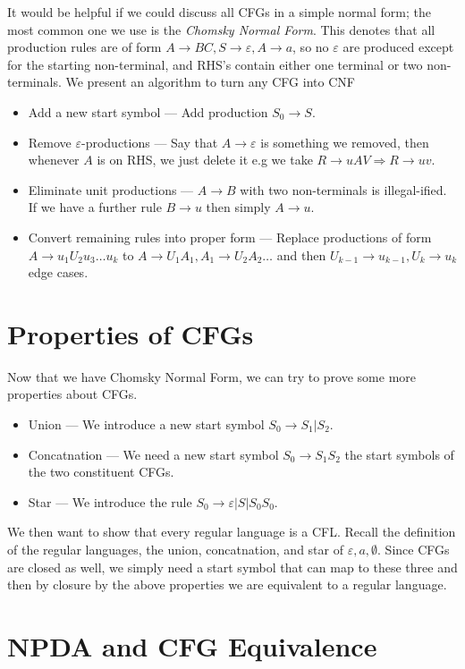 \documentclass[10pt]{report}
\begin{document}
It would be helpful if we could discuss all CFGs in a simple normal form; the most common one we use is the \emph{Chomsky Normal Form}. This denotes that all production rules are of form $A \to BC, S \to \varepsilon, A\to a$, so no $\varepsilon$ are produced except for the starting non-terminal, and RHS's contain either one terminal or two non-terminals. We present an algorithm to turn any CFG into CNF
\begin{itemize}
    \item Add a new start symbol --- Add production $S_0 \to S$.
    \item Remove $\varepsilon$-productions --- Say that $A \to \varepsilon$ is something we removed, then whenever $A$ is on RHS, we just delete it e.g we take $R \to uAV \Rightarrow R \to uv$.
    \item Eliminate unit productions --- $A \to B$ with two non-terminals is illegal-ified. If we have a further rule $B \to u$ then simply $A \to u$.
    \item Convert remaining rules into proper form --- Replace productions of form $A \to u_1 U_2 u_3\dots u_k$ to $A \to U_1A_1, A_1 \to U_2A_2 \dots$ and then $U_{k-1} \to u_{k-1}, U_{k} \to u_k$ edge cases.
\end{itemize}

\section{Properties of CFGs}

Now that we have Chomsky Normal Form, we can try to prove some more properties about CFGs.
\begin{itemize}
    \item Union --- We introduce a new start symbol $S_0 \to S_1 | S_2$.
    \item Concatnation --- We need a new start symbol $S_0 \to S_1S_2$ the start symbols of the two constituent CFGs.
    \item Star --- We introduce the rule $S_0 \to \varepsilon | S | S_0S_0$.
\end{itemize}

We then want to show that every regular language is a CFL. Recall the definition of the regular languages, the union, concatnation, and star of $\varepsilon, a, \emptyset$. Since CFGs are closed as well, we simply need a start symbol that can map to these three and then by closure by the above properties we are equivalent to a regular language.

\section{NPDA and CFG Equivalence}
\end{document}
